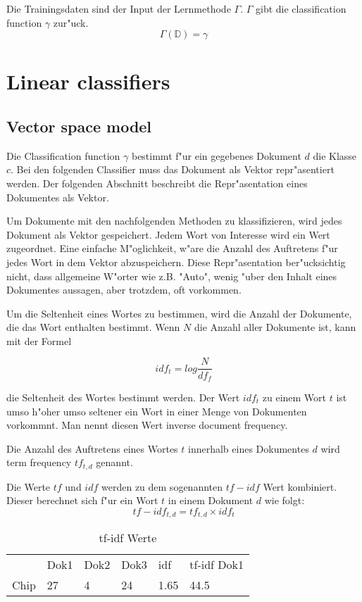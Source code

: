 \documentclass[12pt,a4paper,twoside]{article}
\begin{document}
Die Trainingsdaten sind der Input der Lernmethode $\Gamma$. $\Gamma$ gibt die classification function $\gamma$ zur"uck.
\[
\Gamma(\mathbb{D}) = \gamma
\]

\section{Linear classifiers}
\label{sec:linearclassifiers}

\subsection{Vector space model}
\label{sec:vectorspacemodel}
Die Classification function $\gamma$ bestimmt f"ur ein gegebenes Dokument $d$ die Klasse $c$. Bei den folgenden Classifier muss das Dokument als Vektor re\-pr"as\-entiert werden. Der folgenden Abschnitt beschreibt die Repr"asentation eines Dokumentes als Vektor.

Um Dokumente mit den nachfolgenden Methoden zu klassifizieren, wird jedes Dokument als Vektor gespeichert. Jedem Wort von Interesse wird ein Wert zugeordnet. Eine einfache M"oglichkeit, w"are die Anzahl des Auftretens f"ur jedes Wort in dem Vektor abzuspeichern. Diese Repr"asentation ber"ucksichtig nicht, dass allgemeine W"orter wie z.B. "Auto", wenig "uber den Inhalt eines Dokumentes aussagen, aber trotzdem, oft vorkommen.

Um die Seltenheit eines Wortes zu bestimmen, wird die Anzahl der Dokumente, die das Wort enthalten bestimmt. Wenn $N$ die Anzahl aller Dokumente ist, kann mit der Formel

\[
idf_t = log \frac{ N}{df_f}
\]

die Seltenheit des Wortes bestimmt werden. Der Wert $idf_t$ zu einem Wort $t$ ist umso h"oher umso seltener ein Wort in einer Menge von Dokumenten vorkommnt. Man nennt diesen Wert inverse document frequency\cite{manning08}.

Die Anzahl des Auftretens eines Wortes $t$ innerhalb eines Dokumentes $d$ wird term frequency $tf_{t,d}$ genannt.

Die Werte $tf$ und $idf$ werden zu dem sogenannten $tf-idf$ Wert kombiniert. Dieser berechnet sich f"ur ein Wort $t$ in einem Dokument $d$ wie folgt:
\[
tf-idf_{t,d} = tf_{t,d} \times idf_t
\]

\begin{table}
  \centering
  \begin{tabular}{l l l l l l}
    & Dok1 & Dok2 & Dok3 & idf & tf-idf Dok1 \\
    Chip & 27 & 4 & 24 & 1.65 &44.5  \\
  \end{tabular}
  \caption{tf-idf Werte }
  \label{tab:temporal_operators}
\end{table}
\end{document}
